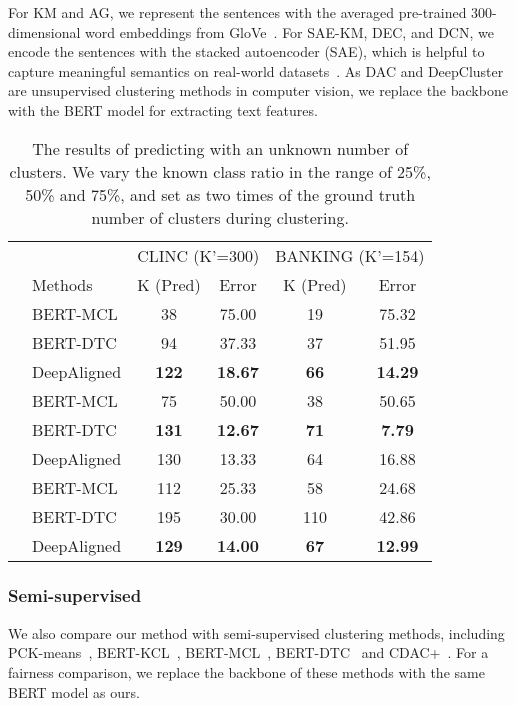 \documentclass[letterpaper]{article} \usepackage{aaai21}  \usepackage{times}  \usepackage{helvet} \usepackage{courier}  \usepackage[hyphens]{url}  \usepackage{graphicx} \urlstyle{rm} \def\UrlFont{\rm}  \usepackage{natbib}  \usepackage{caption} \frenchspacing  \setlength{\pdfpagewidth}{8.5in}  \setlength{\pdfpageheight}{11in}  \usepackage{amsmath}
\begin{document}
	For KM and AG, we represent the sentences with the averaged pre-trained 300-dimensional word embeddings from GloVe~\cite{pennington2014glove}. For SAE-KM, DEC, and DCN, we encode the sentences with the stacked autoencoder (SAE), which is helpful to capture meaningful semantics on real-world datasets~\cite{xie2016unsupervised}. As DAC and DeepCluster are unsupervised clustering methods in computer vision, we replace the backbone with the BERT model for extracting text features.
	\begin{table}\small
		\centering
		\begin{tabular}{@{\extracolsep{0.6pt}}clcccc}
			\toprule
			\centering
&  & \multicolumn{2}{c}{CLINC (K'=300)} & \multicolumn{2}{c}{BANKING (K'=154)} \\
			\addlinespace[0.1cm] \cline{3-4} \cline{5-6}  \addlinespace[0.1cm]
			& Methods &  K (Pred) & Error& K (Pred) & Error\\
			\midrule
			\multirow{3.5}{*}[1ex]{\rotatebox[origin=c]{90}{\it 25\%}} 
&  BERT-MCL & 38 & 75.00 & 19 & 75.32 \\
			&  BERT-DTC & 94 & 37.33 & 37 & 51.95 \\							
			& DeepAligned  & \textbf{122} & \textbf{18.67} & \textbf{66} & \textbf{14.29}\\
			\midrule
			\midrule
			\multirow{1.5}{*}[-1.5ex]{\rotatebox[origin=c]{90}{\it 50\%}}
			& BERT-MCL & 75	& 50.00	& 38 & 50.65	\\
			&  BERT-DTC & \textbf{131} & \textbf{12.67} & \textbf{71} & \textbf{7.79} \\							
			& DeepAligned &130	&13.33	&64	&16.88\\
			\midrule
			\midrule
			\multirow{1.5}{*}[-1.5ex]{\rotatebox[origin=c]{90}{\it 75\%}}
			& BERT-MCL & 112 & 25.33 	& 58 &  24.68 \\
			&  BERT-DTC & 195 & 30.00 & 110 & 42.86 \\							
			& DeepAligned &\textbf{129}	&\textbf{14.00}	&\textbf{67}	&\textbf{12.99}	\\
			\bottomrule
		\end{tabular}
		\caption{  
			The results of predicting  with an unknown number of clusters. We vary the known class ratio in the range of 25\%, 50\% and 75\%, and set  as two times of the ground truth number of clusters during clustering. 
		}
		\label{aba-4} 
	\end{table}
	\subsubsection{Semi-supervised}
	We also compare our method with semi-supervised clustering methods, including PCK-means~\cite{basu2004active}, BERT-KCL~\cite{hsu2018learning}, BERT-MCL~\cite{hsu2018multiclass}, BERT-DTC~\cite{Han2019learning} and  CDAC+~\cite{lin2020discovering}. For a fairness comparison, we replace the backbone of these methods with the same BERT model as ours.
	
\end{document}
